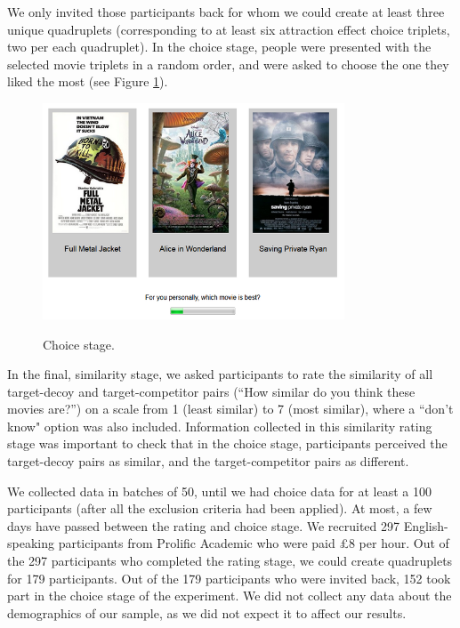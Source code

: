 \documentclass[12pt, a4paper]{article}
\begin{document}
We only invited those participants back for whom we could create at least three unique quadruplets (corresponding to at least six attraction effect choice triplets, two per each quadruplet). In the choice stage, people were presented with the selected movie triplets in a random order, and were asked to choose the one they liked the most (see Figure \ref{fig:exp1_screenshot}).

\begin{figure}[htb!]
\centering
\caption{Choice stage.}
\includegraphics[width=0.8\textwidth]{rsz_exp1_choicestage.png}
\label{fig:exp1_screenshot}
\end{figure}

In the final, similarity stage, we asked participants to rate the similarity of all target-decoy and target-competitor pairs (``How similar do you think these movies are?'') on a scale from 1 (least similar) to 7 (most similar), where a ``don't know" option was also included. Information collected in this similarity rating stage was important to check that in the choice stage, participants perceived the target-decoy pairs as similar, and the target-competitor pairs as different.

We collected data in batches of 50, until we had choice data for at least a 100 participants (after all the exclusion criteria had been applied). At most, a few days have passed between the rating and choice stage. We recruited 297 English-speaking participants from Prolific Academic who were paid £8 per hour. Out of the 297 participants who completed the rating stage, we could create quadruplets for 179 participants. Out of the 179 participants who were invited back, 152 took part in the choice stage of the experiment. We did not collect any data about the demographics of our sample, as we did not expect it to affect our results.
\end{document}
